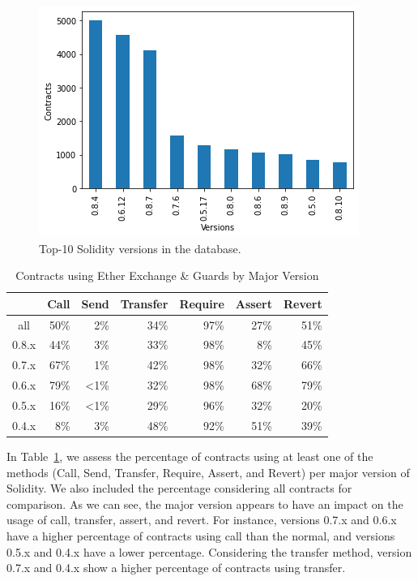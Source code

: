 \documentclass[10pt,conference]{IEEEtran}
\begin{document}
\begin{figure}[h]
  \centering
  \includegraphics[width=\linewidth]{img/clean_versions_final.png}
  \caption{Top-10 Solidity versions in the database.}
  \label{fig:minor-versions}
\end{figure}

\begin{table}
\center
  \caption{Contracts using Ether Exchange \& Guards by Major Version}
  \label{tab:results-version}
  \begin{tabular}{crrrrrr}
    \hline
      & Call & Send & Transfer & Require & Assert & Revert \\
    \hline
    all & 50\% & 2\% & 34\% &  97\% & 27\% & 51\% \\
    0.8.x & 44\% & 3\% & 33\%  & 98\% & 8\% & 45\% \\
    0.7.x & 67\% & 1\% & 42\% & 98\% & 32\% & 66\% \\ 
    0.6.x & 79\% & <1\% & 32\% & 98\% & 68\% & 79\% \\
    0.5.x & 16\% & <1\% & 29\% & 96\% & 32\% & 20\% \\
    0.4.x & 8\% & 3\%  & 48\% & 92\% & 51\% & 39\% \\
    \hline
\end{tabular}
\end{table}

In Table~\ref{tab:results-version}, we assess the percentage of contracts using at least one of the methods (Call, Send, Transfer, Require, Assert, and Revert) per major version of Solidity. We also included the percentage considering all contracts for comparison.  As we can see, the major version appears to have an impact on the usage of call, transfer, assert, and revert. For instance, versions 0.7.x and 0.6.x have a higher percentage of contracts using call than the normal, and versions 0.5.x and 0.4.x have a lower percentage.  Considering the transfer method,  version 0.7.x and 0.4.x show a higher percentage of contracts using transfer.  
\end{document}

